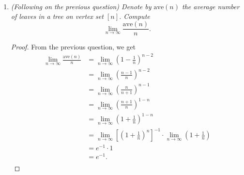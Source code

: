\documentclass{article}
\begin{document}
\begin{enumerate}[label={\bf Q\arabic*:}]
    \begin{proof}
      From the previous question, each vertex appears $(n-1)^{n-2}$ times
      as leaves. Thus, within the $n^{n-2}$ trees on vertex set $[n]$,
      there is a total of $n\cdot(n-1)^{n-2}$ leaves, i.e.
      \[\sum_T l(T) =n\cdot(n-1)^{n-2}.\]
      Thus we have
      \begin{align*}
        \frac{1}{n^{n-2}}\sum_T l(T) &=\frac{n\cdot(n-1)^{n-2}}{n^{n-2}} \\
        &=n\left(1-\frac{1}{n}\right)^{n-2}. \\
      \end{align*}
    \end{proof}

  \item \it (Following on the previous question) Denote by $\text{ave}(n)$
    the average number of leaves in a tree on vertex set $[n]$. Compute
    \[\lim_{n\rightarrow\infty}\frac{\text{ave}(n)}{n}.\]

    \begin{proof}
      From the previous question, we get 
      \begin{align*}
        \lim_{n\rightarrow\infty}\frac{\text{ave}(n)}{n}
          &=\lim_{n\rightarrow\infty}\left(1-\frac{1}{n}\right)^{n-2} \\
          &=\lim_{n\rightarrow\infty}\left(\frac{n-1}{n}\right)^{n-2} \\
          &=\lim_{n\rightarrow\infty}\left(\frac{n}{n+1}\right)^{n-1} \\
          &=\lim_{n\rightarrow\infty}\left(\frac{n+1}{n}\right)^{1-n} \\
          &=\lim_{n\rightarrow\infty}\left(1+\frac{1}{n}\right)^{1-n} \\
          &=\lim_{n\rightarrow\infty}\left[
            \left(1+\frac{1}{n}\right)^{n}\right]^{-1}
            \cdot\lim_{n\rightarrow\infty}
            \left(1+\frac{1}{n}\right) \\
          &=e^{-1}\cdot1 \\
          &=e^{-1}. \\
      \end{align*}
    \end{proof}
\end{enumerate}
\end{document}
